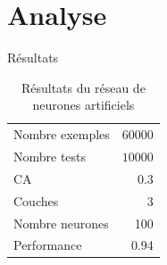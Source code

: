 \documentclass[10pt]{beamer}
\begin{document}

\section{Analyse}

\begin{frame}{R\'esultats}
  \begin{table}
    \caption{R\'esultats du r\'eseau de neurones artificiels}
    \begin{tabular}{lr}
      \toprule
      Nombre exemples & $60000$\\
	  Nombre tests & $10000$\\
      CA & 0.3\\
      Couches  & 3\\
      Nombre neurones & 100\\
      Performance & 0.94\\
      \bottomrule
    \end{tabular}
  \end{table}
\end{frame}
\end{document}
